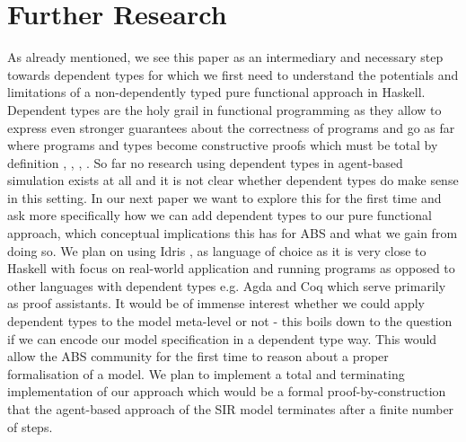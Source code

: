 \section{Further Research}
As already mentioned, we see this paper as an intermediary and necessary step towards dependent types for which we first need to understand the potentials and limitations of a non-dependently typed pure functional approach in Haskell. Dependent types are the holy grail in functional programming as they allow to express even stronger guarantees about the correctness of programs and go as far where programs and types become constructive proofs \cite{wadler_propositions_2015} which must be total by definition \cite{thompson_type_1991}, \cite{altenkirch_why_2005}, \cite{altenkirch_pi_sigma:_2010}, \cite{program_homotopy_2013}. So far no research using dependent types in agent-based simulation exists at all and it is not clear whether dependent types do make sense in this setting. In our next paper we want to explore this for the first time and ask more specifically how we can add dependent types to our pure functional approach, which conceptual implications this has for ABS and what we gain from doing so. We plan on using Idris \cite{brady_idris_2013}, \cite{brady_type-driven_2017} as language of choice as it is very close to Haskell with focus on real-world application and running programs as opposed to other languages with dependent types e.g. Agda and Coq which serve primarily as proof assistants.
It would be of immense interest whether we could apply dependent types to the model meta-level or not - this boils down to the question if we can encode our model specification in a dependent type way. This would allow the ABS community for the first time to reason about a proper formalisation of a model. We plan to implement a total and terminating implementation of our approach which would be a formal proof-by-construction that the agent-based approach of the SIR model terminates after a finite number of steps.